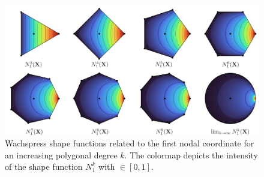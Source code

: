 %
\begin{figure}
\centering
\vspace{-2mm}
\includegraphics[width=\textwidth]{./pdf/thesis-figure-3-wachpress.pdf}
\caption{Wachspress shape functions related to the first nodal coordinate for an increasing polygonal degree $k$. The colormap depicts the intensity of the shape function $N_1^k$ with \protect{}$\!\!\in [0,1]$.}
\label{fig:C3:wachpressExample}
\vspace{-3mm}
\end{figure}
%

